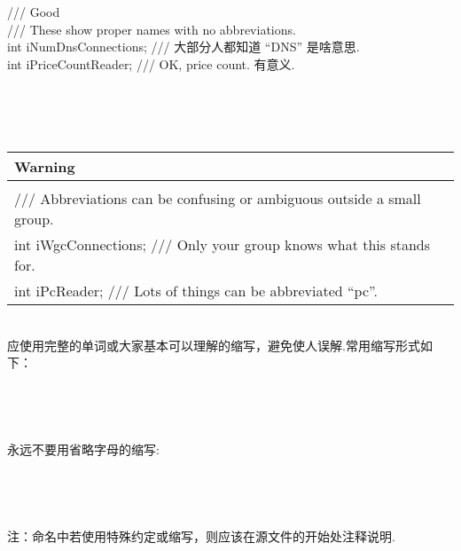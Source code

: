 \documentclass[a4paper,11pt,CJK]{article}
\begin{document}
\begin{CJK}{UTF8}{gbsn}
{\begin{minipage}{400pt}
\indent /// Good\\
\indent /// These show proper names with no abbreviations.\\
\indent int iNumDnsConnections;  /// 大部分人都知道 ``DNS'' 是啥意思.\\
\indent int iPriceCountReader;   /// OK, price count. 有意义.
\end{minipage}
}
\\
\\
\\
\begin{table}[htbp]
\flushleft
\begin{tabular}{p{400pt}}
\toprule
\rowcolor{red} Warning\\
\midrule
\fbox{
\begin{minipage}{390pt}
/// Bad!\\
/// Abbreviations can be confusing or ambiguous outside a small group.\\
\indent int iWgcConnections;  /// Only your group knows what this stands for.\\
\indent int iPcReader;        /// Lots of things can be abbreviated ``pc''.
\end{minipage}
}\\
\bottomrule
\end{tabular}
\end{table}
\\
\indent
应使用完整的单词或大家基本可以理解的缩写，避免使人误解.常用缩写形式如下：\\
\\
\\
\\
\\
永远不要用省略字母的缩写:\\
\\
\\
\\
\\
注：命名中若使用特殊约定或缩写，则应该在源文件的开始处注释说明.

\end{CJK}
\end{document}
